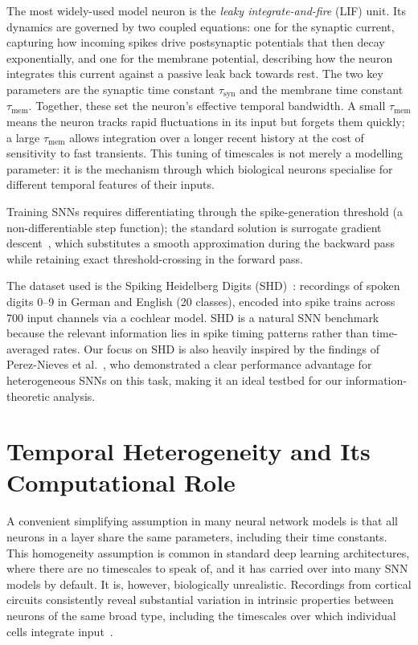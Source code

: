 \documentclass[12pt,twoside]{report}
\begin{document}
The most widely-used model neuron is the \emph{leaky integrate-and-fire} (LIF) unit. 
Its dynamics are governed by two coupled equations: one for the synaptic current, 
capturing how incoming spikes drive postsynaptic potentials that then decay 
exponentially, and one for the membrane potential, describing how the neuron integrates 
this current against a passive leak back towards rest. The two key parameters are the 
synaptic time constant $\tau_\text{syn}$ and the membrane time constant $\tau_\text{mem}$. 
Together, these set the neuron's effective temporal bandwidth. A small $\tau_\text{mem}$ 
means the neuron tracks rapid fluctuations in its input but forgets them quickly; a 
large $\tau_\text{mem}$ allows integration over a longer recent history at the cost of 
sensitivity to fast transients. This tuning of timescales is not merely a modelling 
parameter: it is the mechanism through which biological neurons specialise for different 
temporal features of their inputs.

Training SNNs requires differentiating through the spike-generation threshold (a
non-differentiable step function); the standard solution is surrogate gradient
descent~\cite{zenke2021}, which substitutes a smooth approximation during the backward
pass while retaining exact threshold-crossing in the forward pass.

The dataset used is the Spiking Heidelberg Digits (SHD)~\cite{cramer2022}: recordings
of spoken digits 0--9 in German and English (20 classes), encoded into spike trains
across 700 input channels via a cochlear model. SHD is a natural SNN benchmark because
the relevant information lies in spike timing patterns rather than time-averaged rates.
Our focus on SHD is also heavily inspired by the findings of Perez-Nieves et al.~\cite{pereznieves2021}, 
who demonstrated a clear performance advantage for heterogeneous SNNs on this task, 
making it an ideal testbed for our information-theoretic analysis.

\section{Temporal Heterogeneity and Its Computational Role}

A convenient simplifying assumption in many neural network models is that all neurons 
in a layer share the same parameters, including their time constants. This homogeneity 
assumption is common in standard deep learning architectures, where there are no 
timescales to speak of, and it has carried over into many SNN models by default. It is, 
however, biologically unrealistic. Recordings from cortical circuits consistently reveal 
substantial variation in intrinsic properties between neurons of the same broad type, 
including the timescales over which individual cells integrate input~\cite{gerstner2002}.
\end{document}
